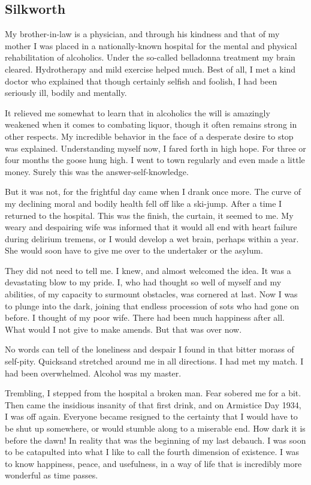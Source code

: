 \subsection{Silkworth}

My brother-in-law is a physician, and through his kindness and that of my mother I was placed in a nationally-known hospital for the mental and physical rehabilitation of alcoholics.
Under the so-called belladonna treatment my brain cleared.
Hydrotherapy and mild exercise helped much.
Best of all, I met a kind doctor who explained that though certainly selfish and foolish, I had been seriously ill, bodily and mentally.

It relieved me somewhat to learn that in alcoholics the will is amazingly weakened when it comes to combating liquor, though it often remains strong in other respects.
My incredible behavior in the face of a desperate desire to stop was explained.
Understanding myself now, I fared forth in high hope.
For three or four months the goose hung high.
I went to town regularly and even made a little money.
Surely this was the answer-self-knowledge.

But it was not, for the frightful day came when I drank once more.
The curve of my declining moral and bodily health fell off like a ski-jump.
After a time I returned to the hospital.
This was the finish, the curtain, it seemed to me.
My weary and despairing wife was informed that it would all end with heart failure during delirium tremens, or I would develop a wet brain, perhaps within a year.
She would soon have to give me over to the undertaker or the asylum.

They did not need to tell me.
I knew, and almost welcomed the idea.
It was a devastating blow to my pride.
I, who had thought so well of myself and my abilities, of my capacity to surmount obstacles, was cornered at last.
Now I was to plunge into the dark, joining that endless procession of sots who had gone on before.
I thought of my poor wife.
There had been much happiness after all.
What would I not give to make amends.
But that was over now.

No words can tell of the loneliness and despair I found in that bitter morass of self-pity.
Quicksand stretched around me in all directions.
I had met my match.
I had been overwhelmed.
Alcohol was my master.

Trembling, I stepped from the hospital a broken man.
Fear sobered me for a bit.
Then came the insidious insanity of that first drink, and on Armistice Day 1934, I was off again.
Everyone became resigned to the certainty that I would have to be shut up somewhere, or would stumble along to a miserable end.
How dark it is before the dawn!
In reality that was the beginning of my last debauch.
I was soon to be catapulted into what I like to call the fourth dimension of existence.
I was to know happiness, peace, and usefulness, in a way of life that is incredibly more wonderful as time passes.


